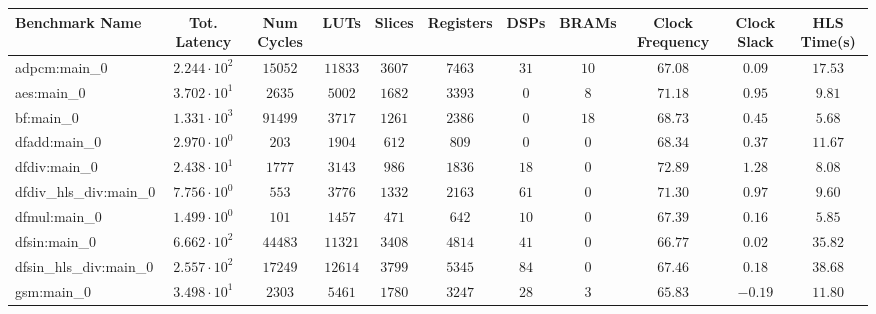 \begin{tabular}{|l|c|c|c|c|c|c|c|c|c|c|}
\hline
Benchmark Name          & Tot. Latency           & Num Cycles & LUTs      & Slices    & Registers & DSPs    & BRAMs   & Clock Frequency & Clock Slack & HLS Time(s) \\
\hline
adpcm:main\_0           & $ 2.244 \cdot 10^{2} $ & $ 15052  $ & $ 11833 $ & $ 3607  $ & $ 7463  $ & $ 31  $ & $ 10  $ & $ 67.08       $ & $ 0.09    $ & $ 17.53   $ \\
aes:main\_0             & $ 3.702 \cdot 10^{1} $ & $ 2635   $ & $ 5002  $ & $ 1682  $ & $ 3393  $ & $ 0   $ & $ 8   $ & $ 71.18       $ & $ 0.95    $ & $ 9.81    $ \\
bf:main\_0              & $ 1.331 \cdot 10^{3} $ & $ 91499  $ & $ 3717  $ & $ 1261  $ & $ 2386  $ & $ 0   $ & $ 18  $ & $ 68.73       $ & $ 0.45    $ & $ 5.68    $ \\
dfadd:main\_0           & $ 2.970 \cdot 10^{0} $ & $ 203    $ & $ 1904  $ & $ 612   $ & $ 809   $ & $ 0   $ & $ 0   $ & $ 68.34       $ & $ 0.37    $ & $ 11.67   $ \\
dfdiv:main\_0           & $ 2.438 \cdot 10^{1} $ & $ 1777   $ & $ 3143  $ & $ 986   $ & $ 1836  $ & $ 18  $ & $ 0   $ & $ 72.89       $ & $ 1.28    $ & $ 8.08    $ \\
dfdiv\_hls\_div:main\_0 & $ 7.756 \cdot 10^{0} $ & $ 553    $ & $ 3776  $ & $ 1332  $ & $ 2163  $ & $ 61  $ & $ 0   $ & $ 71.30       $ & $ 0.97    $ & $ 9.60    $ \\
dfmul:main\_0           & $ 1.499 \cdot 10^{0} $ & $ 101    $ & $ 1457  $ & $ 471   $ & $ 642   $ & $ 10  $ & $ 0   $ & $ 67.39       $ & $ 0.16    $ & $ 5.85    $ \\
dfsin:main\_0           & $ 6.662 \cdot 10^{2} $ & $ 44483  $ & $ 11321 $ & $ 3408  $ & $ 4814  $ & $ 41  $ & $ 0   $ & $ 66.77       $ & $ 0.02    $ & $ 35.82   $ \\
dfsin\_hls\_div:main\_0 & $ 2.557 \cdot 10^{2} $ & $ 17249  $ & $ 12614 $ & $ 3799  $ & $ 5345  $ & $ 84  $ & $ 0   $ & $ 67.46       $ & $ 0.18    $ & $ 38.68   $ \\
gsm:main\_0             & $ 3.498 \cdot 10^{1} $ & $ 2303   $ & $ 5461  $ & $ 1780  $ & $ 3247  $ & $ 28  $ & $ 3   $ & $ 65.83       $ & $ -0.19   $ & $ 11.80   $ \\

\end{tabular}
